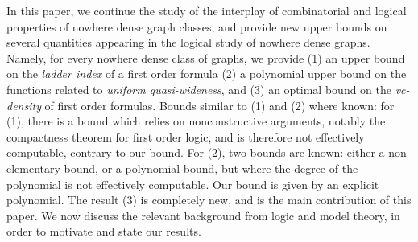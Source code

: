 In this paper, we continue the study of the 
interplay of combinatorial and logical properties
of nowhere dense graph classes, and provide
new upper bounds on several
quantities appearing in the logical study of nowhere dense graphs.
Namely, for every nowhere dense class of graphs, we provide (1) an upper bound on the \emph{ladder index} of a first order formula
(2) a polynomial upper bound on the 
functions related to \emph{uniform quasi-wideness},
and (3) an optimal bound on the \emph{vc-density} of first order formulas. Bounds similar to (1) and (2)
where known: %
for (1), there is a bound which relies on 
 nonconstructive arguments, notably the compactness theorem for first order logic, and is therefore not effectively computable, contrary to our bound. For (2), two bounds are known:
 either a non-elementary bound, or a polynomial bound, but where the degree of the polynomial is not effectively computable. Our bound is given by an explicit polynomial.
The result (3) is completely new, and is the main contribution of this paper. We now discuss the relevant background from logic and model theory, in order to motivate and state our results.



\bigskip










